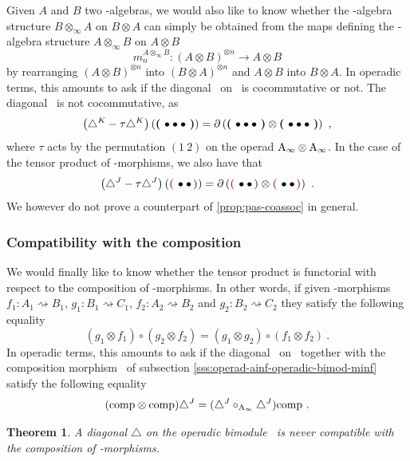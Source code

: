 \documentclass[twoside, 12pt]{amsart}
\newtheorem{theorem}{Theorem}
\theoremstyle{remark}
\begin{document}
Given $A$ and $B$ two \Ainf -algebras, we would also like to know whether the \Ainf -algebra structure $B \otimes_\infty A$ on $B \otimes A$ can simply be obtained from the maps defining the \Ainf -algebra structure $A \otimes_\infty B$ on $A \otimes B$ \[ m_n^{A \otimes_\infty B} : ( A \otimes B)^{\otimes n} \rightarrow A \otimes B \] by rearranging $(A \otimes B)^{\otimes n}$ into $(B \otimes A)^{\otimes n}$ and $A \otimes B$ into $B \otimes A$. In operadic terms, this amounts to ask if the diagonal \diagainf\ on \Ainf\ is cocommutative or not. The diagonal \diagainf\ is not cocommutative, as 
\[ \left( \triangle^{K} - \tau \triangle^{K} \right) \left( \boldsymbol{\left(\right.}  \bullet \bullet \bullet  \boldsymbol{\left.\right)} \right) = \partial \left( \boldsymbol{\left(\right.}  \bullet \bullet \bullet  \boldsymbol{\left.\right)} \otimes \boldsymbol{\left(\right.}  \bullet \bullet \bullet  \boldsymbol{\left.\right)} \right) \ , \]
where $\tau$ acts by the permutation $(1 \ 2)$ on the operad $\mathrm{A}_\infty \otimes \mathrm{A}_\infty$.
In the case of the tensor product of \Ainf -morphisms, we also have that
\[ \left( \diagminf - \tau \diagminf \right) \left( \purple{\bullet \bullet} \right) = \partial \left( \purple{\bullet \bullet} \otimes \purple{\bullet \bullet} \right) \ . \]
We however do not prove a counterpart of \cref{prop:pas-coassoc} in general.
 
\subsubsection{Compatibility with the composition} \label{sss:comp-composition}

We would finally like to know whether the tensor product is functorial with respect to the composition of \Ainf -morphisms. In other words, if given \Ainf -morphisms $f_1 : A_1 \rightsquigarrow B_1$, 
$g_1 : B_1 \rightsquigarrow C_1$, $f_2 : A_2 \rightsquigarrow B_2$ and
$g_2 : B_2 \rightsquigarrow C_2$ they satisfy the following equality
\[ ( g_1 \otimes f_1) \circ (g_2 \otimes f_2) = (g_1 \otimes g_2) \circ (f_1 \otimes f_2) \ . \]
In operadic terms, this amounts to ask if the diagonal \diagminf\ on \Minf\ together with the composition morphism \comp\ of subsection \ref{sss:operad-ainf-operadic-bimod-minf} satisfy the following equality 
\[ ( \mathrm{comp} \otimes \mathrm{comp} ) \triangle^{J} = (\triangle^{J} \circ_{\mathrm{A}_\infty} \triangle^{J} ) \mathrm{comp}   \ . \]

\begin{theorem} 
  \label{thm:nofunctorial}
  A diagonal $\triangle$ on the operadic bimodule \Minf\ is never compatible with the composition of \Ainf -morphisms.  
\end{theorem}
\end{document}

